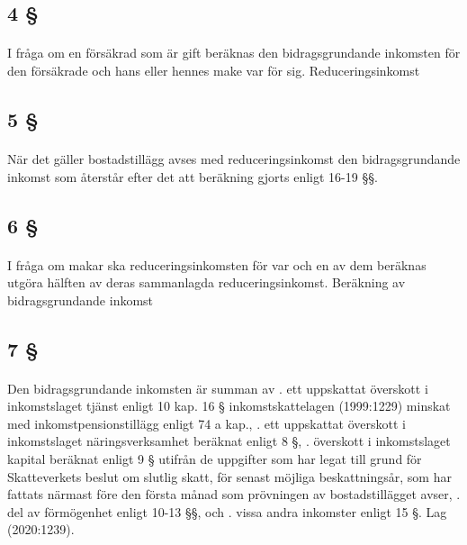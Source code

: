 \documentclass[a4paper,notitlepage,openany,10pt]{book}
\begin{document}
\subsection*{4 §}
\paragraph*{}
I fråga om en försäkrad som är gift beräknas den bidragsgrundande inkomsten för den försäkrade och hans eller hennes make var för sig.
Reduceringsinkomst
\subsection*{5 §}
\paragraph*{}
När det gäller bostadstillägg avses med reduceringsinkomst den bidragsgrundande inkomst som återstår efter det att beräkning gjorts enligt 16-19 §§.
\subsection*{6 §}
\paragraph*{}
I fråga om makar ska reduceringsinkomsten för var och en av dem beräknas utgöra hälften av deras sammanlagda reduceringsinkomst.
Beräkning av bidragsgrundande inkomst
\subsection*{7 §}
\paragraph*{}
Den bidragsgrundande inkomsten är summan av
. ett uppskattat överskott i inkomstslaget tjänst enligt 10 kap. 16 § inkomstskattelagen (1999:1229) minskat med inkomstpensionstillägg enligt 74 a kap.,
. ett uppskattat överskott i inkomstslaget näringsverksamhet beräknat enligt 8 §,
. överskott i inkomstslaget kapital beräknat enligt 9 § utifrån de uppgifter som har legat till grund för Skatteverkets beslut om slutlig skatt, för senast möjliga beskattningsår, som har fattats närmast före den första månad som prövningen av bostadstillägget avser,
. del av förmögenhet enligt 10-13 §§, och
. vissa andra inkomster enligt 15 §.
Lag (2020:1239).
\end{document}
